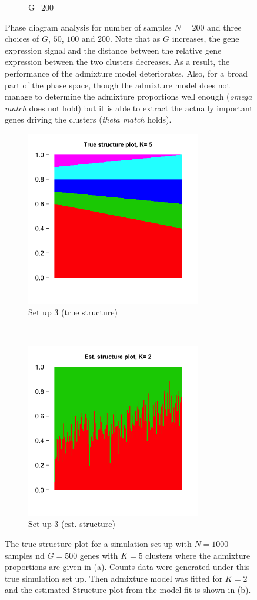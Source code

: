 \begin{figure}[ht]
\begin{subfigure}[t]{0.5\textwidth}
        \caption{G=200}
    \end{subfigure}   
    \caption{Phase diagram analysis for number of samples $N=200$ and three choices of $G$, $50$, $100$ and $200$. Note that as $G$ increases, the gene expression signal and the distance between the relative gene expression between the two clusters decreases. As a result, the performance of the admixture model deteriorates. Also, for a broad part of the phase space, though the admixture model does not manage to determine the admixture proportions well enough (\textit{omega match} does not hold) but it is able to extract the actually important genes driving the clusters (\textit{theta match} holds).}
    \end{figure}
    
 
 \begin{figure}[ht]
    \centering
    \begin{subfigure}[t]{0.5\textwidth}
        \centering
        \includegraphics[height=3in]{../plots/true_structure_setup_3.png}
        \caption{Set up 3 (true structure)}
    \end{subfigure}%
    ~ 
    \begin{subfigure}[t]{0.5\textwidth}
        \centering
        \includegraphics[height=3in]{../plots/est_structure_setup_3.png}
        \caption{Set up 3 (est. structure)}
    \end{subfigure}
    \caption{The true structure plot for a simulation set up with $N=1000$ samples nd $G=500$ genes with $K=5$ clusters where the admixture proportions are given in (a). Counts data were generated under this true simulation set up. Then admixture model was fitted for $K=2$ and the estimated Structure plot from the model fit is shown in (b).}
\end{figure}


